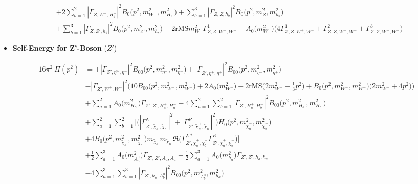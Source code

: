 \begin{itemize}
\begin{align}
 &+2 \sum_{b=1}^{2}|{\Gamma_{Z,W^+,H^-_{{b}}}}|^2 {B_0\Big(p^{2},m^2_{W^-},m^2_{H^-_{{b}}}\Big)}  +\sum_{b=1}^{3}|{\Gamma_{Z,Z,h_{{b}}}}|^2 {B_0\Big(p^{2},m^2_{Z},m^2_{h_{{b}}}\Big)} \nonumber \\ 
 &+\sum_{b=1}^{3}|{\Gamma_{Z,{Z'},h_{{b}}}}|^2 {B_0\Big(p^{2},m^2_{{Z'}},m^2_{h_{{b}}}\Big)} +2 \text{rMS} m^2_{W^-} {\Gamma^{1}_{Z,Z,W^+,W^-}} - {A_0\Big(m^2_{W^-}\Big)} \Big(4 {\Gamma^{1}_{Z,Z,W^+,W^-}}  + {\Gamma^{2}_{Z,Z,W^+,W^-}} + {\Gamma^{3}_{Z,Z,W^+,W^-}}\Big) 
\end{align} 
\item {\bf Self-Energy for Z'-Boson} \thickspace (\({Z'}\)) 

\begin{align} 
16\pi^2 \ \Pi(p^2) &= +|{\Gamma_{{Z'},\bar{\eta^-},\eta^-}}|^2 {B_{00}\Big(p^{2},m^2_{\eta^-},m^2_{\eta^-}\Big)} +|{\Gamma_{{Z'},\bar{\eta^+},\eta^+}}|^2 {B_{00}\Big(p^{2},m^2_{\eta^+},m^2_{\eta^+}\Big)} \nonumber \\ 
 &- |{\Gamma_{{Z'},W^+,W^-}}|^2 \Big(10 {B_{00}\Big(p^{2},m^2_{W^-},m^2_{W^-}\Big)}  + 2 {A_0\Big(m^2_{W^-}\Big)}  -2 \text{rMS} \Big(2 m^2_{W^-}  -\frac{1}{3} p^{2} \Big) + {B_0\Big(p^{2},m^2_{W^-},m^2_{W^-}\Big)} \Big(2 m^2_{W^-}  + 4 p^{2} \Big)\Big)\nonumber \\ 
 &+\sum_{a=1}^{2}{A_0\Big(m^2_{H^-_{{a}}}\Big)} {\Gamma_{{Z'},{Z'},H^+_{{a}},H^-_{{a}}}} -4 \sum_{a=1}^{2}\sum_{b=1}^{2}|{\Gamma_{{Z'},H^+_{{a}},H^-_{{b}}}}|^2 {B_{00}\Big(p^{2},m^2_{H^-_{{a}}},m^2_{H^-_{{b}}}\Big)}  \nonumber \\ 
 &+\sum_{a=1}^{2}\sum_{b=1}^{2} \Big[\Big(|{\Gamma^L_{{Z'},\tilde{\chi}^+_{{a}},\tilde{\chi}^-_{{b}}}}|^2 + |{\Gamma^R_{{Z'},\tilde{\chi}^+_{{a}},\tilde{\chi}^-_{{b}}}}|^2\Big){H_0\Big(p^{2},m^2_{\tilde{\chi}^-_{{a}}},m^2_{\tilde{\chi}^-_{{b}}}\Big)} \nonumber \\ & +4 {B_0\Big(p^{2},m^2_{\tilde{\chi}^-_{{a}}},m^2_{\tilde{\chi}^-_{{b}}}\Big)} m_{\tilde{\chi}^-_{{a}}} m_{\tilde{\chi}^-_{{b}}} {\Re\Big({\Gamma^{L*}_{{Z'},\tilde{\chi}^+_{{a}},\tilde{\chi}^-_{{b}}}} {\Gamma^R_{{Z'},\tilde{\chi}^+_{{a}},\tilde{\chi}^-_{{b}}}} \Big)} \Big]\nonumber \\ 
 &+\frac{1}{2} \sum_{a=1}^{3}{A_0\Big(m^2_{A^0_{{a}}}\Big)} {\Gamma_{{Z'},{Z'},A^0_{{a}},A^0_{{a}}}}  +\frac{1}{2} \sum_{a=1}^{3}{A_0\Big(m^2_{h_{{a}}}\Big)} {\Gamma_{{Z'},{Z'},h_{{a}},h_{{a}}}}  \nonumber \\ 
 &-4 \sum_{a=1}^{3}\sum_{b=1}^{3}|{\Gamma_{{Z'},h_{{a}},A^0_{{b}}}}|^2 {B_{00}\Big(p^{2},m^2_{A^0_{{b}}},m^2_{h_{{a}}}\Big)}  \nonumber \\ 

\end{align}
\end{itemize}
